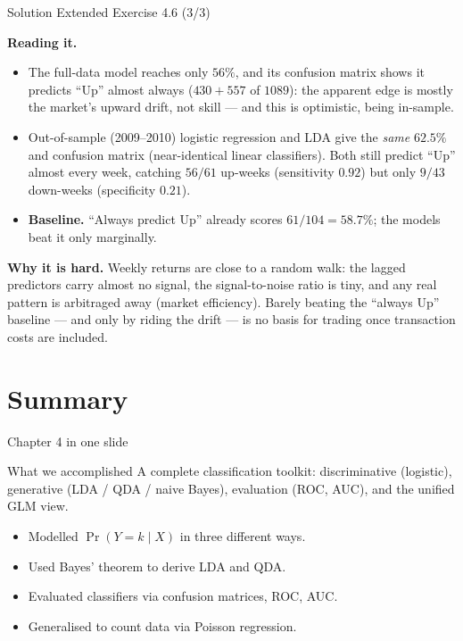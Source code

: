 \documentclass[aspectratio=169,11pt]{beamer}
\begin{document}
\begin{frame}{Solution \textemdash{} Extended Exercise 4.6 (3/3)}
\begin{solutionbox}
\textbf{Reading it.}
\begin{itemize}
  \item The full-data model reaches only $56\%$, and its confusion matrix
        shows it predicts ``Up'' almost always ($430+557$ of $1089$): the
        apparent edge is mostly the market's upward drift, not skill ---
        and this is optimistic, being in-sample.
  \item Out-of-sample (2009--2010) logistic regression and LDA give the
        \emph{same} $62.5\%$ and confusion matrix (near-identical linear
        classifiers). Both still predict ``Up'' almost every week, catching
        $56/61$ up-weeks (sensitivity $0.92$) but only $9/43$ down-weeks
        (specificity $0.21$).
  \item \textbf{Baseline.} ``Always predict Up'' already scores
        $61/104=58.7\%$; the models beat it only marginally.
\end{itemize}
\textbf{Why it is hard.} Weekly returns are close to a random walk: the
lagged predictors carry almost no signal, the signal-to-noise ratio is
tiny, and any real pattern is arbitraged away (market efficiency). Barely
beating the ``always Up'' baseline --- and only by riding the drift --- is
no basis for trading once transaction costs are included.
\end{solutionbox}
\end{frame}

\section{Summary}

\begin{frame}{Chapter 4 in one slide}
  \begin{block}{What we accomplished}
    A complete classification toolkit: discriminative (logistic),
    generative (LDA / QDA / naive Bayes), evaluation (ROC, AUC), and
    the unified GLM view.
  \end{block}
  \begin{itemize}
    \item Modelled $\Pr(Y = k \mid X)$ in three different ways.
    \item Used Bayes' theorem to derive LDA and QDA.
    \item Evaluated classifiers via confusion matrices, ROC, AUC.
    \item Generalised to count data via Poisson regression.
  \end{itemize}
\end{frame}
\end{document}
